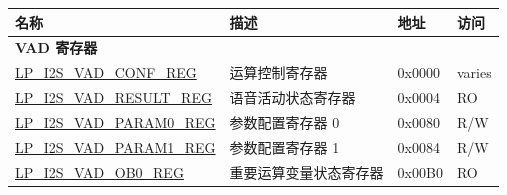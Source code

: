 \begin{longtable}{ | p{6cm} | p{7.2cm} | p{1.3cm} | p{1cm} | }
\hline\rowcolor{lightgray}
\textbf{名称} & \textbf{描述} &  \textbf{地址} & \textbf{访问} \\ \hline
\endhead
\multicolumn{4}{|l|}{\textbf{VAD 寄存器}} \\ \hline
\hyperref[regdesc:LPI2SVADCONFREG]{LP\_I2S\_VAD\_CONF\_REG} & 运算控制寄存器 & 0x0000 & varies \\ \hline
\hyperref[regdesc:LPI2SVADRESULTREG]{LP\_I2S\_VAD\_RESULT\_REG} & 语音活动状态寄存器  & 0x0004 & RO \\ \hline
\hyperref[regdesc:LPI2SVADPARAM0REG]{LP\_I2S\_VAD\_PARAM0\_REG} & 参数配置寄存器 0 & 0x0080 & R/W \\ \hline
\hyperref[regdesc:LPI2SVADPARAM1REG]{LP\_I2S\_VAD\_PARAM1\_REG} & 参数配置寄存器 1 & 0x0084 & R/W \\ \hline
\hyperref[regdesc:LPI2SVADOB0REG]{LP\_I2S\_VAD\_OB0\_REG} & 重要运算变量状态寄存器  & 0x00B0 & RO \\ \hline
\end{longtable}
